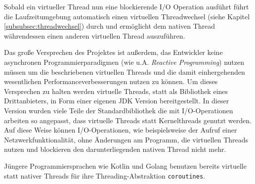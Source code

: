 Sobald ein virtueller Thread nun eine blockierende I/O Operation ausführt führt die Laufzeitumgebung automatisch einen
virtuellen Threadwechsel (siehe Kapitel \ref{subsubsec:threadwechsel}) durch und ermöglicht dem nativen Thread währendessen einen
anderen virtuellen Thread auszuführen.

Das große Versprechen des Projektes ist außerdem, das Entwickler keine asynchronen Programmierparadigmen (wie u.A. \textit{Reactive Programming})
nutzen müssen um die beschriebenen virtuellen Threads und die damit einhergehenden wesentlichen Performanceverbesserungen nutzen zu können.
Um dieses Versprechen zu halten werden virtuelle Threads, statt als Bibliothek eines Drittanbieters, in Form einer eigenen JDK Version bereitgestellt.
In dieser Version wurden viele Teile der Standardbibliothek die mit I/O-Operationen arbeiten so angepasst, dass virtuelle Threads statt Kernelthreads
genutzt werden. Auf diese Weise können I/O-Operationen, wie beispielsweise der Aufruf einer Netzwerkfunktionalität, ohne Änderungen am Programm,
die virtuellen Threads nutzen und blockieren den darunterliegenden nativen Thread nicht mehr.

Jüngere Programmiersprachen wie Kotlin und Golang benutzen bereits virtuelle statt nativer Threads
für ihre Threading-Abstraktion \verb|coroutines|. \parencite{KotlinCoroutines, GoCoroutines}